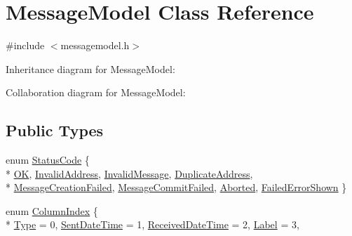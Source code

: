 \hypertarget{class_message_model}{}\section{Message\+Model Class Reference}
\label{class_message_model}


{\ttfamily \#include $<$messagemodel.\+h$>$}



Inheritance diagram for Message\+Model\+:


Collaboration diagram for Message\+Model\+:
\subsection*{Public Types}
\begin{DoxyCompactItemize}
\item 
enum \hyperlink{class_message_model_adac070d47edccd1bc8358cdc976f8509}{Status\+Code} \{ \\*
\hyperlink{class_message_model_adac070d47edccd1bc8358cdc976f8509a0ac8092e6dc45d02798074612826cc43}{O\+K}, 
\hyperlink{class_message_model_adac070d47edccd1bc8358cdc976f8509ae4b0314d8f665b726423ee7fe0c0713d}{Invalid\+Address}, 
\hyperlink{class_message_model_adac070d47edccd1bc8358cdc976f8509a8132a7431b90de1dbf0cb50165bbf7d0}{Invalid\+Message}, 
\hyperlink{class_message_model_adac070d47edccd1bc8358cdc976f8509a883e447082b3ece01f526be9c46fee8e}{Duplicate\+Address}, 
\\*
\hyperlink{class_message_model_adac070d47edccd1bc8358cdc976f8509aec250445cabd6a1cffc7e55661b85299}{Message\+Creation\+Failed}, 
\hyperlink{class_message_model_adac070d47edccd1bc8358cdc976f8509accf1cad016b19465ce9ddd55a4bcd406}{Message\+Commit\+Failed}, 
\hyperlink{class_message_model_adac070d47edccd1bc8358cdc976f8509a89565743283160a08f41e42406b3dbbd}{Aborted}, 
\hyperlink{class_message_model_adac070d47edccd1bc8358cdc976f8509ae86208c061871c17117ffc330478fa80}{Failed\+Error\+Shown}
 \}
\item 
enum \hyperlink{class_message_model_a06abed7ec66ac487a58ca87fd84e2053}{Column\+Index} \{ \\*
\hyperlink{class_message_model_a06abed7ec66ac487a58ca87fd84e2053a35b041fc060add8ce4952b59797b93b9}{Type} = 0, 
\hyperlink{class_message_model_a06abed7ec66ac487a58ca87fd84e2053a9d846a413ba2eff3ae06b87abea5584d}{Sent\+Date\+Time} = 1, 
\hyperlink{class_message_model_a06abed7ec66ac487a58ca87fd84e2053a1e67305ebd1a4457769b04e39d1f4f07}{Received\+Date\+Time} = 2, 
\hyperlink{class_message_model_a06abed7ec66ac487a58ca87fd84e2053a289fb42f068383bcffc0dc4e1cd82cc7}{Label} = 3, 

\end{DoxyCompactItemize}
